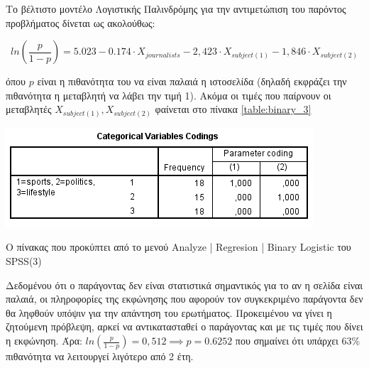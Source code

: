 \documentclass{assignment}
\begin{document}
\begin{Assignment}[Μέρος Ε]
Το βέλτιστο μοντέλο Λογιστικής Παλινδρόμης για την αντιμετώπιση του παρόντος προβλήματος δίνεται ως ακολούθως:

\begin{equation}
ln(\frac{p}{1-p}) = 5.023 -0.174 \cdot X_{journalists} - 2,423 \cdot X_{subject(1)} - 1,846 \cdot X_{subject(2)}
\end{equation}

όπου $p$ είναι η πιθανότητα του να είναι παλαιά η ιστοσελίδα (δηλαδή εκφράζει την πιθανότητα η μεταβλητή να λάβει την τιμή 1). Ακόμα οι τιμές που παίρνουν οι μεταβλητές $X_{subject(1)},X_{subject(2)}$ φαίνεται στο πίνακα \ref{table:binary_3}

\begin{table}[htbp]
\includegraphics[width=\textwidth]{images/table_binary_category.png}
\caption{Ο πίνακας που προκύπτει από το μενού Analyze | Regresion | Binary Logistic του SPSS(3) }
\label{table:binary_3}
\end{table}


Δεδομένου ότι ο παράγοντας  δεν είναι στατιστικά σημαντικός για το αν η σελίδα είναι παλαιά, οι πληροφορίες της εκφώνησης που αφορούν τον συγκεκριμένο παράγοντα δεν θα ληφθούν υπόψιν για την απάντηση του ερωτήματος. Προκειμένου να γίνει η ζητούμενη πρόβλεψη, αρκεί να αντικατασταθεί ο παράγοντας  και  με τις τιμές που δίνει η εκφώνηση. Άρα:
$ln(\frac{p}{1-p}) = 0,512 \implies p = 0.6252$ που σημαίνει ότι υπάρχει 63\% πιθανότητα να λειτουργεί λιγότερο από 2 έτη.



\end{Assignment}


 \label{Βιβλιογραφία}



\newpage
\end{document}
